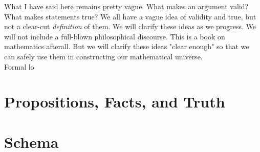     What I have said here remains pretty vague. What makes an argument valid? What makes statements true? We all have a vague idea of validity and true, but not a clear-cut \textit{definition} of them. We will clarify these ideas as we progress. We will not include a full-blown philosophical discourse. This is a book on mathematics afterall. But we will clarify these ideas "clear enough" so that we can safely use them in constructing our mathematical universe.\\
    Formal lo
    \section{Propositions, Facts, and Truth}
    \section{Schema}